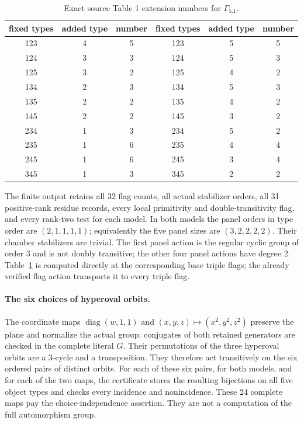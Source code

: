 \documentclass[11pt]{article}
\begin{document}
\begin{table}[t]\centering
\begin{tabular}{ccc@{\qquad}ccc}\toprule
fixed types&added type&number&fixed types&added type&number\\\midrule
123&4&5&123&5&5\\124&3&3&124&5&3\\125&3&2&125&4&2\\
134&2&3&134&5&3\\135&2&2&135&4&2\\145&2&2&145&3&2\\
234&1&3&234&5&2\\235&1&6&235&4&4\\245&1&6&245&3&4\\
345&1&3&345&2&2\\\bottomrule
\end{tabular}
\caption{Exact source Table 1 extension numbers for $\Gamma_{5.1}$.}
\label{tab:ext}\end{table}

The finite output retains all 32 flag counts, all actual stabilizer orders,
all 31 positive-rank residue records, every local primitivity and
double-transitivity flag, and every rank-two test for each model. In both
models the panel orders in type order are $(2,1,1,1,1)$; equivalently the
five panel sizes are $(3,2,2,2,2)$. Their chamber stabilizers are trivial.
The first panel action is the regular cyclic group of order 3 and is not
doubly transitive; the other four panel actions have degree 2.
Table~\ref{tab:ext} is computed directly at the corresponding base triple
flags; the already verified flag action transports it to every triple flag.

\paragraph{The six choices of hyperoval orbits.}
The coordinate maps $\operatorname{diag}(w,1,1)$ and
$(x,y,z)\mapsto(x^2,y^2,z^2)$ preserve the plane and normalize the actual
group: conjugates of both retained generators are checked in the complete
literal $G$. Their permutations of the three hyperoval orbits are a
3-cycle and a transposition. They therefore act transitively on the six
ordered pairs of distinct orbits. For each of these six pairs, for both
models, and for each of the two maps, the certificate stores the resulting
bijections on all five object types and checks every incidence and
nonincidence. These 24 complete maps pay the choice-independence assertion.
They are not a computation of the full automorphism group.
\end{document}
